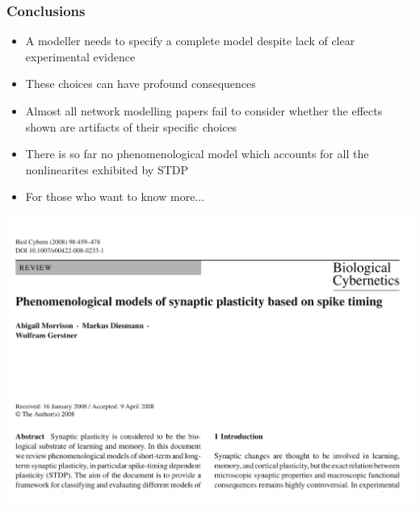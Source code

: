 \documentclass{beamer}
\begin{document}
\begin{frame}
\frametitle{Conclusions}
\begin{itemize}
\item A modeller needs to specify a complete model despite lack of clear experimental evidence
\item These choices can have profound consequences
\item Almost all network modelling papers fail to consider whether the effects shown are artifacts of their specific choices
\item There is so far no phenomenological model which accounts for all the nonlinearites exhibited by STDP 
\item For those who want to know more...
\end{itemize}
\includegraphics[width=\textwidth]{./figures/bio_cyb}
\end{frame}
\end{document}
